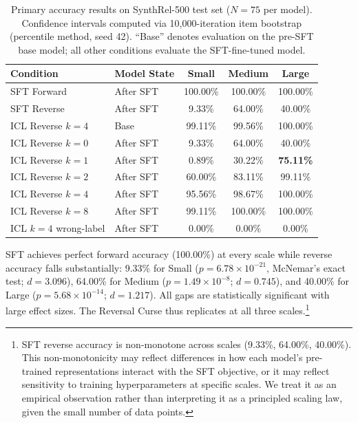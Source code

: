 \documentclass[11pt]{article}
\begin{document}
\begin{table}[h]
\centering
\caption{Primary accuracy results on SynthRel-500 test set ($N=75$ per model).
Confidence intervals computed via 10,000-iteration item bootstrap (percentile
method, seed 42). ``Base'' denotes evaluation on the pre-SFT base model;
all other conditions evaluate the SFT-fine-tuned model.}
\label{tab:main_results}
\begin{tabular}{llccc}
\toprule
\textbf{Condition} & \textbf{Model State} & \textbf{Small} & \textbf{Medium} & \textbf{Large} \\
\midrule
SFT Forward       & After SFT & 100.00\% & 100.00\% & 100.00\% \\
SFT Reverse       & After SFT &   9.33\% &  64.00\% &  40.00\% \\
\midrule
ICL Reverse $k=4$ & Base      &  99.11\% &  99.56\% & 100.00\% \\
\midrule
ICL Reverse $k=0$ & After SFT &   9.33\% &  64.00\% &  40.00\% \\
ICL Reverse $k=1$ & After SFT &   0.89\% &  30.22\% &  \textbf{75.11\%} \\
ICL Reverse $k=2$ & After SFT &  60.00\% &  83.11\% &  99.11\% \\
ICL Reverse $k=4$ & After SFT &  95.56\% &  98.67\% & 100.00\% \\
ICL Reverse $k=8$ & After SFT &  99.11\% & 100.00\% & 100.00\% \\
\midrule
ICL $k=4$ wrong-label & After SFT & 0.00\% &   0.00\% &   0.00\% \\
\bottomrule
\end{tabular}
\end{table}

SFT achieves perfect forward accuracy (100.00\%) at every scale while reverse
accuracy falls substantially: 9.33\% for Small ($p = 6.78 \times 10^{-21}$,
McNemar's exact test; $d = 3.096$), 64.00\% for Medium ($p = 1.49 \times
10^{-8}$; $d = 0.745$), and 40.00\% for Large ($p = 5.68 \times 10^{-14}$;
$d = 1.217$). All gaps are statistically significant with large effect sizes.
The Reversal Curse thus replicates at all three scales.\footnote{SFT reverse
accuracy is non-monotone across scales (9.33\%, 64.00\%, 40.00\%). This
non-monotonicity may reflect differences in how each model's pre-trained
representations interact with the SFT objective, or it may reflect sensitivity
to training hyperparameters at specific scales. We treat it as an empirical
observation rather than interpreting it as a principled scaling law, given the
small number of data points.}
\end{document}
